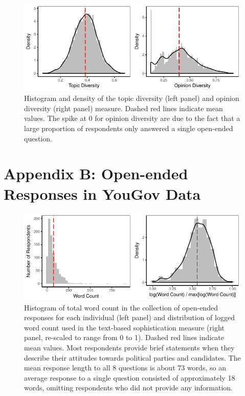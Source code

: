 \documentclass[12pt]{article}
\begin{document}
\begin{figure}[h]\centering
\includegraphics{../fig/diversity.pdf}
\caption{Histogram and density of the topic diversity (left panel) and opinion diversity (right panel) measure. Dashed red lines indicate mean values. The spike at 0 for opinion diversity are due to the fact that a large proportion of respondents only answered a single open-ended question.}\label{fig:diversity}
\end{figure}


\clearpage
\section*{Appendix B: Open-ended Responses in YouGov Data}
\renewcommand\thefigure{B.\arabic{figure}}
\renewcommand\thetable{B.\arabic{table}}
\setcounter{figure}{0}
\setcounter{table}{0}

\begin{figure}[h]\centering
\includegraphics{../fig/yg_wc.pdf}
\caption{Histogram of total word count in the collection of open-ended responses for each individual (left panel) and distribution of logged word count used in the text-based sophistication measure (right panel, re-scaled to range from 0 to 1). Dashed red lines indicate mean values. Most respondents provide brief statements when they describe their attitudes towards political parties and candidates. The mean response length to all 8 questions is about 73 words, so an average response to a single question consisted of approximately 18 words, omitting respondents who did not provide any information.}\label{fig:yg_wc}
\end{figure}
\end{document}
